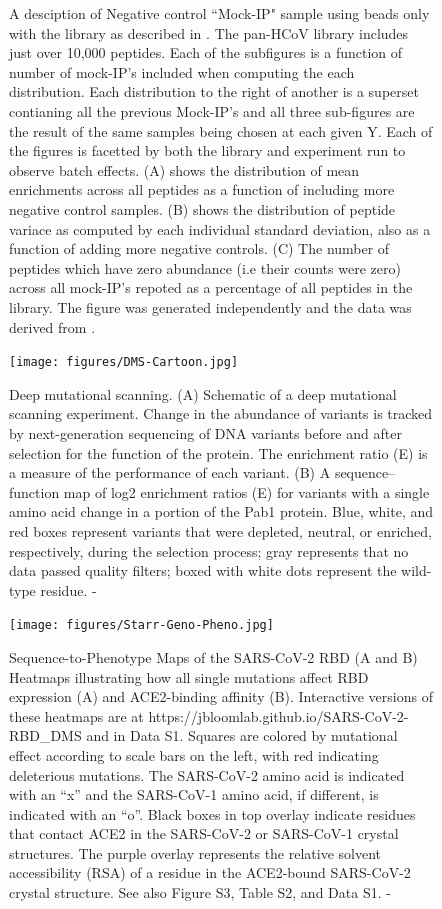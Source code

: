 \documentclass{article}
\newcommand{\beginsupplement}{%
        \setcounter{table}{0}
        \renewcommand{\thetable}{S\arabic{table}}%
        \setcounter{figure}{0}
        \renewcommand{\thefigure}{S\arabic{figure}}%
     }
\begin{document}
\begin{figure}
    \caption{A desciption of Negative control ``Mock-IP" sample using beads only with the library as described in \citet{Stoddard2020}. The pan-HCoV library includes just over 10,000 peptides. Each of the subfigures is a function of number of mock-IP's included when computing the each distribution. Each distribution to the right of another is a superset contianing all the previous Mock-IP's and all three sub-figures are the result of the same samples being chosen at each given Y. Each of the figures is facetted by both the library and experiment run to observe batch effects. (A) shows the distribution of mean enrichments across all peptides as a function of including more negative control samples. (B) shows the distribution of peptide variace as computed by each individual standard deviation, also as a function of adding more negative controls. (C) The number of peptides which have zero abundance (i.e their counts were zero) across all mock-IP's repoted as a percentage of all peptides in the library. The figure was generated independently and the data was derived from \citet{Stoddard2020}.} 
\label{fig:Mock-IP}
\end{figure}

\begin{figure}[h]
\centering
\texttt{[image: figures/DMS-Cartoon.jpg]}
    \caption{Deep mutational scanning. (A) Schematic of a deep mutational scanning experiment. Change in the abundance of variants is tracked by next-generation sequencing of DNA variants before and after selection for the function of the protein. The enrichment ratio (E) is a measure of the performance of each variant. (B) A sequence–function map of log2 enrichment ratios (E) for variants with a single amino acid change in a portion of the Pab1 protein. Blue, white, and red boxes represent variants that were depleted, neutral, or enriched, respectively, during the selection process; gray represents that no data passed quality filters; boxed with white dots represent the wild-type residue. - \citep{Starita2015}}
\label{fig:DMS-Cartoon}
\end{figure}

\begin{figure}[h]
\centering
\texttt{[image: figures/Starr-Geno-Pheno.jpg]}
    \caption{Sequence-to-Phenotype Maps of the SARS-CoV-2 RBD (A and B) Heatmaps illustrating how all single mutations affect RBD expression (A) and ACE2-binding affinity (B). Interactive versions of these heatmaps are at https://jbloomlab.github.io/SARS-CoV-2-RBD\_DMS and in Data S1. Squares are colored by mutational effect according to scale bars on the left, with red indicating deleterious mutations. The SARS-CoV-2 amino acid is indicated with an “x” and the SARS-CoV-1 amino acid, if different, is indicated with an “o”. Black boxes in top overlay indicate residues that contact ACE2 in the SARS-CoV-2 or SARS-CoV-1 crystal structures. The purple overlay represents the relative solvent accessibility (RSA) of a residue in the ACE2-bound SARS-CoV-2 crystal structure. See also Figure S3, Table S2, and Data S1. - \citep{Starr2020}}
\label{fig:Starr-Geno-Pheno}
\end{figure}



\end{document}
